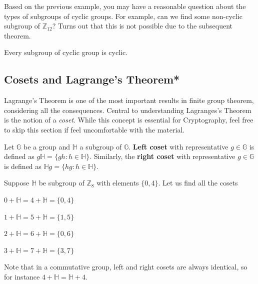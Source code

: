 \documentclass[../lecture-notes-148x210.tex]{subfiles}
\begin{document}
Based on the previous example, you may have a reasonable question about the types of subgroups 
of cyclic groups. For example, can we find some non-cyclic subgroup of $\mathbb{Z}_{12}$? Turns 
out that this is not possible due to the subsequent theorem.

\begin{theorem}
    Every subgroup of cyclic group is cyclic.
\end{theorem}

\subsection{Cosets and Lagrange's Theorem*}
 
Lagrange's Theorem is one of the most important
results in finite group theorem, considering all the consequences. Central to
understanding Lagranges's Theorem is the notion of a \textit{coset}. While 
this concept is essential for Cryptography, feel free to skip this section if feel 
uncomfortable with the material.

\begin{definition}
    Let $\mathbb{G}$ be a group and $\mathbb{H}$ a subgroup of $\mathbb{G}$.
    \textbf{Left coset} with representative $g \in \mathbb{G}$ is defined as
    $g\mathbb{H} = \{gh : h \in \mathbb{H}\}$. Similarly, the \textbf{right
    coset} with representative $g \in \mathbb{G}$ is defined as $\mathbb{H}g =
    \{hg : h \in \mathbb{H}\}$.
\end{definition}

\begin{example}
    Suppose $\mathbb{H}$ be subgroup of $\mathbb{Z}_{8}$ with elements $\{0, 4\}$. 
    Let us find all the cosets
    \begin{center} %
        \vspace{-8mm}
        \item $0 + \mathbb{H} = 4 + \mathbb{H} = \{0, 4\}$
        \item $1 + \mathbb{H} = 5 + \mathbb{H} = \{1, 5\}$
        \item $2 + \mathbb{H} = 6 + \mathbb{H} = \{0, 6\}$
        \item $3 + \mathbb{H} = 7 + \mathbb{H} = \{3, 7\}$
    \end{center}
\end{example}

Note that in a commutative group, left and right cosets are always identical, so for instance $4+\mathbb{H}=\mathbb{H}+4$.
\end{document}
